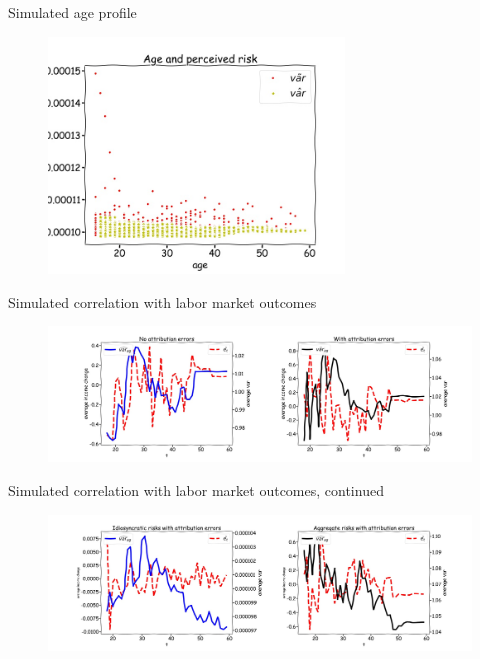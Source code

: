 \documentclass{beamer}
\begin{document}
\begin{frame}{Simulated age profile}
	\begin{figure}
		\centering 
		\label{var_experience_var}
		\includegraphics[width=0.7\textwidth]{figures/var_age_sim.jpg}
	\end{figure}
\end{frame}


\begin{frame}{Simulated correlation with labor market outcomes}
	\begin{figure}
		\centering 
		\label{var_experience_var}
		\includegraphics[width=\textwidth]{figures/var_recent_change_sim.jpg}
	\end{figure}
\end{frame}


\begin{frame}{Simulated correlation with labor market outcomes, continued}
	\begin{figure}
		\centering 
		\label{var_experience_var}
		\includegraphics[width=\textwidth]{figures/var_recent_change_sim2.jpg}
	\end{figure}
\end{frame}
\end{document}
